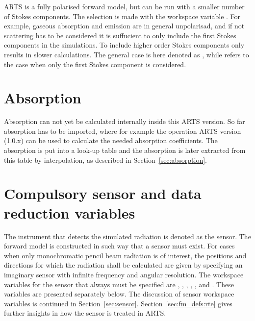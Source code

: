 ARTS is a fully polarised forward model, but can be run with a smaller
number of Stokes components. The selection is made with the workspace
variable . For example, gaseous absorption and
emission are in general unpolarisad, and if not scattering has to be
considered it is suffucient to only include the first Stokes
components in the simulations. To include higher order Stokes
components only results in slower calculations. The general case is
here denoted as , while
 refers to the case when only
the first Stokes component is considered.



\section{Absorption}
\label{sec:fm_defs:absorption}

Absorption can not yet be calculated internally inside this ARTS
version. So far absorption has to be imported, where for example the
operation ARTS version (1.0.x) can be used to calculate the needed
absorption coefficients. The absorption is put into a look-up table
and the absorption is later extracted from this table by
interpolation, as described in Section~\ref{sec:absorption}.



\section{Compulsory sensor and data reduction variables}
\label{sec:fm_defs:sensor1}

The instrument that detects the simulated radiation is denoted as the
sensor. The forward model is constructed in such
way that a sensor must exist. For cases when only monochromatic pencil
beam radiation is of interest, the positions and directions for which
the radiation shall be calculated are given by specifying an imaginary
sensor with infinite frequency and angular resolution. The workspace
variables for the sensor that always must be specified are
, ,
, ,
,  and
. These variables are presented separately below. The
discussion of sensor workspace variables is continued in
Section~\ref{sec:sensor}. Section~\ref{sec:fm_defs:rte} gives further
insights in how the sensor is treated in ARTS.


